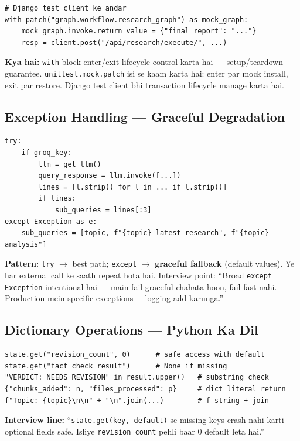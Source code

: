 \begin{codestorybox}
\begin{lstlisting}[style=pythonstyle, caption={with pattern}]
# Django test client ke andar
with patch("graph.workflow.research_graph") as mock_graph:
    mock_graph.invoke.return_value = {"final_report": "..."}
    resp = client.post("/api/research/execute/", ...)
\end{lstlisting}

\textbf{Kya hai:} \texttt{with} block enter/exit lifecycle control karta hai --- setup/teardown guarantee. \texttt{unittest.mock.patch} isi se kaam karta hai: enter par mock install, exit par restore. Django test client bhi transaction lifecycle manage karta hai.
\end{codestorybox}

\subsection{Exception Handling --- Graceful Degradation}

\begin{codestorybox}
\begin{lstlisting}[style=pythonstyle, caption={agents/researcher.py se}]
try:
    if groq_key:
        llm = get_llm()
        query_response = llm.invoke([...])
        lines = [l.strip() for l in ... if l.strip()]
        if lines:
            sub_queries = lines[:3]
except Exception as e:
    sub_queries = [topic, f"{topic} latest research", f"{topic} analysis"]
\end{lstlisting}

\textbf{Pattern:} \texttt{try} $\rightarrow$ best path; \texttt{except} $\rightarrow$ \textbf{graceful fallback} (default values). Ye har external call ke saath repeat hota hai. Interview point: ``Broad \texttt{except Exception} intentional hai --- main fail-graceful chahata hoon, fail-fast nahi. Production mein specific exceptions + logging add karunga.''
\end{codestorybox}

\subsection{Dictionary Operations --- Python Ka Dil}

\begin{codestorybox}
\begin{lstlisting}[style=pythonstyle, caption={Dict patterns used}]
state.get("revision_count", 0)      # safe access with default
state.get("fact_check_result")      # None if missing
"VERDICT: NEEDS_REVISION" in result.upper()   # substring check
{"chunks_added": n, "files_processed": p}     # dict literal return
f"Topic: {topic}\n\n" + "\n".join(...)        # f-string + join
\end{lstlisting}

\textbf{Interview line:} ``\texttt{state.get(key, default)} se missing keys crash nahi karti --- optional fields safe. Isliye \texttt{revision\_count} pehli baar 0 default leta hai.''
\end{codestorybox}

